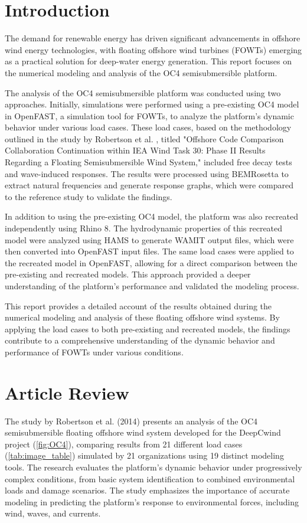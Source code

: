 \documentclass[a4paper, 11pt]{article}
\begin{document}
\section{Introduction}

\hspace*{0.5cm}The demand for renewable energy has driven significant advancements in offshore wind energy technologies, with floating offshore wind turbines (FOWTs) emerging as a practical solution for deep-water energy generation. This report focuses on the numerical modeling and analysis of the OC4 semisubmersible platform. 

The analysis of the OC4 semisubmersible platform was conducted using two approaches. Initially, simulations were performed using a pre-existing OC4 model in OpenFAST, a simulation tool for FOWTs, to analyze the platform's dynamic behavior under various load cases. These load cases, based on the methodology outlined in the study by Robertson et al. \cite{Robertson2014}, titled "Offshore Code Comparison Collaboration Continuation within IEA Wind Task 30: Phase II Results Regarding a Floating Semisubmersible Wind System," included free decay tests and wave-induced responses. The results were processed using BEMRosetta to extract natural frequencies and generate response graphs, which were compared to the reference study to validate the findings.

In addition to using the pre-existing OC4 model, the platform was also recreated independently using Rhino 8. The hydrodynamic properties of this recreated model were analyzed using HAMS to generate WAMIT output files, which were then converted into OpenFAST input files. The same load cases were applied to the recreated model in OpenFAST, allowing for a direct comparison between the pre-existing and recreated models. This approach provided a deeper understanding of the platform's performance and validated the modeling process.

This report provides a detailed account of the results obtained during the numerical modeling and analysis of these floating offshore wind systems. By applying the load cases to both pre-existing and recreated models, the findings contribute to a comprehensive understanding of the dynamic behavior and performance of FOWTs under various conditions.

\section{Article Review}
\hspace*{0.5cm}The study by Robertson et al. (2014) presents an analysis of the OC4 semisubmersible floating offshore wind system developed for the DeepCwind project (\autoref{fig:OC4}), comparing results from 21 different load cases (\autoref{tab:image_table}) simulated by 21 organizations using 19 distinct modeling tools. The research evaluates the platform’s dynamic behavior under progressively complex conditions, from basic system identification to combined environmental loads and damage scenarios. The study emphasizes the importance of accurate modeling in predicting the platform's response to environmental forces, including wind, waves, and currents. 
\end{document}

